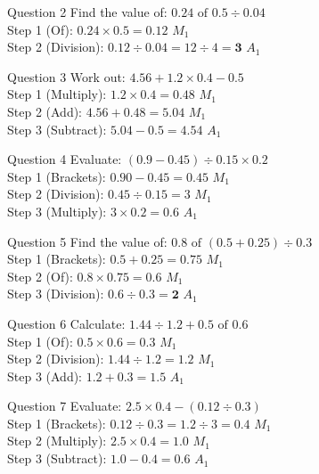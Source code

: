 \documentclass[12pt, a4paper, oneside]{article}
\begin{document}
\begin{solvingbox}{Question 2}
Find the value of: $0.24 \text{ of } 0.5 \div 0.04$ \\
Step 1 (Of): $0.24 \times 0.5 = 0.12$ \hfill $M_1$ \\
Step 2 (Division): $0.12 \div 0.04 = 12 \div 4 = \mathbf{3}$ \hfill $A_1$
\end{solvingbox}

\begin{solvingbox}{Question 3}
Work out: $4.56 + 1.2 \times 0.4 - 0.5$ \\
Step 1 (Multiply): $1.2 \times 0.4 = 0.48$ \hfill $M_1$ \\
Step 2 (Add): $4.56 + 0.48 = 5.04$ \hfill $M_1$ \\
Step 3 (Subtract): $5.04 - 0.5 = \mathbf{4.54}$ \hfill $A_1$
\end{solvingbox}

\begin{solvingbox}{Question 4}
Evaluate: $(0.9 - 0.45) \div 0.15 \times 0.2$ \\
Step 1 (Brackets): $0.90 - 0.45 = 0.45$ \hfill $M_1$ \\
Step 2 (Division): $0.45 \div 0.15 = 3$ \hfill $M_1$ \\
Step 3 (Multiply): $3 \times 0.2 = \mathbf{0.6}$ \hfill $A_1$
\end{solvingbox}

\begin{solvingbox}{Question 5}
Find the value of: $0.8 \text{ of } (0.5 + 0.25) \div 0.3$ \\
Step 1 (Brackets): $0.5 + 0.25 = 0.75$ \hfill $M_1$ \\
Step 2 (Of): $0.8 \times 0.75 = 0.6$ \hfill $M_1$ \\
Step 3 (Division): $0.6 \div 0.3 = \mathbf{2}$ \hfill $A_1$
\end{solvingbox}

\begin{solvingbox}{Question 6}
Calculate: $1.44 \div 1.2 + 0.5 \text{ of } 0.6$ \\
Step 1 (Of): $0.5 \times 0.6 = 0.3$ \hfill $M_1$ \\
Step 2 (Division): $1.44 \div 1.2 = 1.2$ \hfill $M_1$ \\
Step 3 (Add): $1.2 + 0.3 = \mathbf{1.5}$ \hfill $A_1$
\end{solvingbox}

\begin{solvingbox}{Question 7}
Evaluate: $2.5 \times 0.4 - (0.12 \div 0.3)$ \\
Step 1 (Brackets): $0.12 \div 0.3 = 1.2 \div 3 = 0.4$ \hfill $M_1$ \\
Step 2 (Multiply): $2.5 \times 0.4 = 1.0$ \hfill $M_1$ \\
Step 3 (Subtract): $1.0 - 0.4 = \mathbf{0.6}$ \hfill $A_1$
\end{solvingbox}
\end{document}
